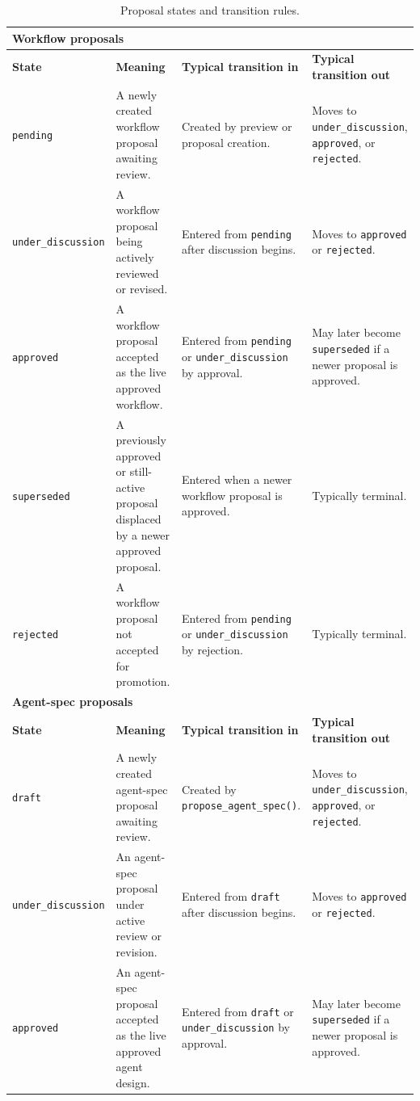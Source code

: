 \begin{table}[htbp]
\centering
\caption{Proposal states and transition rules.}
\begin{tabular}{p{2.7cm} p{4.4cm} p{4.1cm} p{4.1cm}}
\hline
\multicolumn{4}{l}{\textbf{Workflow proposals}} \\
\hline
\textbf{State} & \textbf{Meaning} & \textbf{Typical transition in} & \textbf{Typical transition out} \\
\hline
\texttt{pending} & A newly created workflow proposal awaiting review. & Created by preview or proposal creation. & Moves to \texttt{under\_discussion}, \texttt{approved}, or \texttt{rejected}. \\
\texttt{under\_discussion} & A workflow proposal being actively reviewed or revised. & Entered from \texttt{pending} after discussion begins. & Moves to \texttt{approved} or \texttt{rejected}. \\
\texttt{approved} & A workflow proposal accepted as the live approved workflow. & Entered from \texttt{pending} or \texttt{under\_discussion} by approval. & May later become \texttt{superseded} if a newer proposal is approved. \\
\texttt{superseded} & A previously approved or still-active proposal displaced by a newer approved proposal. & Entered when a newer workflow proposal is approved. & Typically terminal. \\
\texttt{rejected} & A workflow proposal not accepted for promotion. & Entered from \texttt{pending} or \texttt{under\_discussion} by rejection. & Typically terminal. \\
\hline
\multicolumn{4}{l}{\textbf{Agent-spec proposals}} \\
\hline
\textbf{State} & \textbf{Meaning} & \textbf{Typical transition in} & \textbf{Typical transition out} \\
\hline
\texttt{draft} & A newly created agent-spec proposal awaiting review. & Created by \texttt{propose\_agent\_spec()}. & Moves to \texttt{under\_discussion}, \texttt{approved}, or \texttt{rejected}. \\
\texttt{under\_discussion} & An agent-spec proposal under active review or revision. & Entered from \texttt{draft} after discussion begins. & Moves to \texttt{approved} or \texttt{rejected}. \\
\texttt{approved} & An agent-spec proposal accepted as the live approved agent design. & Entered from \texttt{draft} or \texttt{under\_discussion} by approval. & May later become \texttt{superseded} if a newer proposal is approved. \\

\end{tabular}
\end{table}
